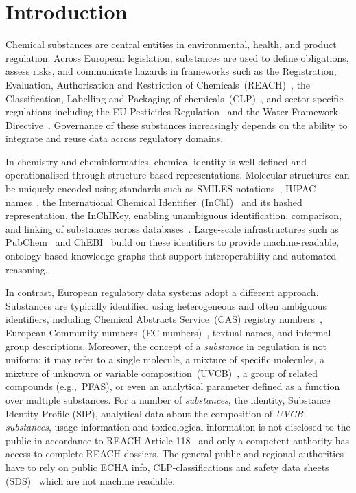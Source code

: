 \section{Introduction} \label{sec:introduction}
Chemical substances are central entities in environmental, health, and product regulation. Across European legislation, substances are used to define obligations, assess risks, and communicate hazards in frameworks such as the Registration, Evaluation, Authorisation and Restriction of Chemicals~(REACH)~\cite{REACH2006}, the Classification, Labelling and Packaging of chemicals~(CLP)~\cite{CLP2008}, and sector-specific regulations including the EU Pesticides Regulation~\cite{EC2009PesticidesReg} and the Water Framework Directive~\cite{EC2000WFD}. Governance of these substances increasingly depends on the ability to integrate and reuse data across regulatory domains.

In chemistry and cheminformatics, chemical identity is well-defined and operationalised through structure-based representations. Molecular structures can be uniquely encoded using standards such as SMILES notations~\cite{Weininger1988}, IUPAC names~\cite{Koppenol2016}, the International Chemical Identifier~(InChI)~\cite{Heller2015} and its hashed representation, the InChIKey, enabling unambiguous identification, comparison, and linking of substances across databases~\cite{Akhondi2012}. Large-scale infrastructures such as PubChem~\cite{Kim2015} and ChEBI~\cite{Degtyarenko2008} build on these identifiers to provide machine-readable, ontology-based knowledge graphs that support interoperability and automated reasoning.

In contrast, European regulatory data systems adopt a different approach. Substances are typically identified using heterogeneous and often ambiguous identifiers, including Chemical Abstracts Service~(CAS) registry numbers~\cite{CAS,Dittmar1976}, European Community numbers~(EC-numbers)~\cite{ECHA_EC_numbers}, textual names, and informal group descriptions.  Moreover, the concept of a \emph{substance} in regulation is not uniform: it may refer to a single molecule, a mixture of specific molecules, a mixture of unknown or variable composition~(UVCB)~\cite{Kutsarova2019}, a group of related compounds (e.g.,~PFAS), or even an analytical parameter defined as a function over multiple substances. For a number of \emph{substances}, the identity, Substance Identity Profile (SIP), analytical data about the composition of \emph{UVCB substances}, usage information and toxicological information is not disclosed to the public in accordance to REACH Article 118~\cite{reach_art118} and only a competent authority has access to complete REACH-dossiers. The general public and regional authorities have to rely on public ECHA info, CLP-classifications and safety data sheets (SDS)~\cite{reach_art31,reach_art119} which are not machine readable.

